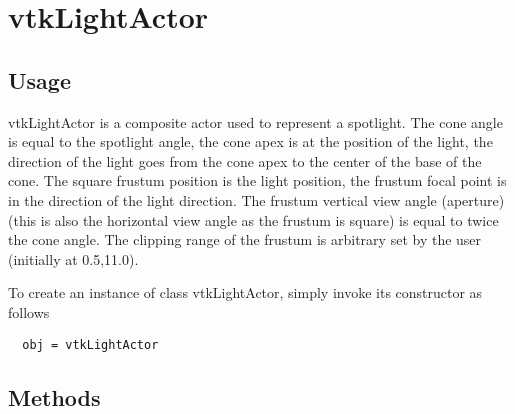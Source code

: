 \section{vtkLightActor}

\subsection{Usage}

 vtkLightActor is a composite actor used to represent a spotlight. The cone
 angle is equal to the spotlight angle, the cone apex is at the position of
 the light, the direction of the light goes from the cone apex to the center
 of the base of the cone. The square frustum position is the light position,
 the frustum focal point is in the direction of the light direction. The
 frustum vertical view angle (aperture) (this is also the horizontal view
 angle as the frustum is square) is equal to twice the cone angle. The
 clipping range of the frustum is arbitrary set by the user
 (initially at 0.5,11.0).

To create an instance of class vtkLightActor, simply
invoke its constructor as follows
\begin{verbatim}
  obj = vtkLightActor
\end{verbatim}
\subsection{Methods}

